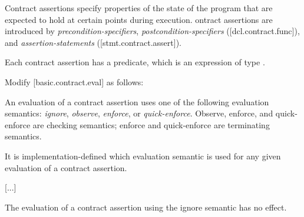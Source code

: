 \begin{adjustwidth}{0.5cm}{0.5cm}
Contract assertions specify properties of the state of the program
that are expected to hold at certain points during execution. ontract assertions
are introduced by \emph{precondition-specifiers}, \emph{postcondition-specifiers} ([dcl.contract.func]),
and \emph{assertion-statements} ([stmt.contract.assert]). 

Each contract assertion has a predicate, which is an expression of type . 
\begin{note}
\end{note}
\end{adjustwidth}

Modify [basic.contract.eval] as follows:

\begin{adjustwidth}{0.5cm}{0.5cm}
An evaluation of a contract assertion uses one of the following  evaluation semantics: 
\emph{ignore}, 
\emph{observe}, 
\emph{enforce}, or 
\emph{quick-enforce}. 
Observe, enforce, and quick-enforce are checking semantics; enforce and quick-enforce are terminating semantics.

It is implementation-defined which evaluation semantic is used for any given evaluation of a contract assertion.  


[...]

The evaluation of a contract assertion using the ignore  semantic has no effect. 

\end{adjustwidth}

